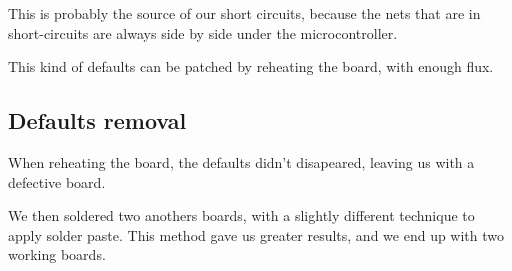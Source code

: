 This is probably the source of our short circuits, because the nets that are in
short-circuits are always side by side under the microcontroller.

This kind of defaults can be patched by reheating the board, with enough flux.

\subsection{Defaults removal}
When reheating the board, the defaults didn't disapeared, leaving us with a
defective board.

We then soldered two anothers boards, with a slightly different technique to
apply solder paste. This method gave us greater results, and we end up with two
working boards.
